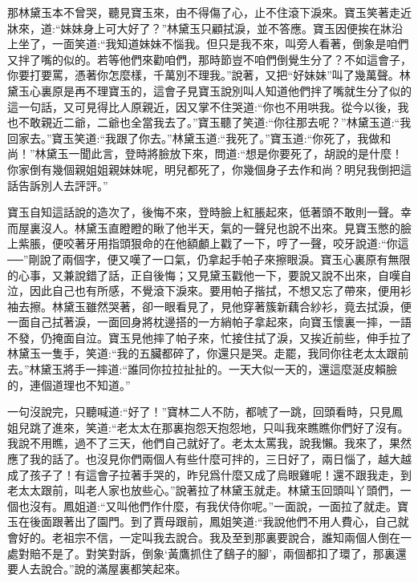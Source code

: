 \begin{parag}
    那林黛玉本不曾哭，聽見寶玉來，由不得傷了心，止不住滾下淚來。寶玉笑著走近牀來，道:“妹妹身上可大好了？”林黛玉只顧拭淚，並不答應。寶玉因便挨在牀沿上坐了，一面笑道:“我知道妹妹不惱我。但只是我不來，叫旁人看著，倒象是咱們又拌了嘴的似的。若等他們來勸咱們，那時節豈不咱們倒覺生分了？不如這會子，你要打要罵，憑著你怎麼樣，千萬別不理我。”說著，又把“好妹妹”叫了幾萬聲。林黛玉心裏原是再不理寶玉的，這會子見寶玉說別叫人知道他們拌了嘴就生分了似的這一句話，又可見得比人原親近，因又掌不住哭道:“你也不用哄我。從今以後，我也不敢親近二爺，二爺也全當我去了。”寶玉聽了笑道:“你往那去呢？”林黛玉道:“我回家去。”寶玉笑道:“我跟了你去。”林黛玉道:“我死了。”寶玉道:“你死了，我做和尚！”林黛玉一聞此言，登時將臉放下來，問道:“想是你要死了，胡說的是什麼！你家倒有幾個親姐姐親妹妹呢，明兒都死了，你幾個身子去作和尚？明兒我倒把這話告訴別人去評評。”
\end{parag}


\begin{parag}
    寶玉自知這話說的造次了，後悔不來，登時臉上紅脹起來，低著頭不敢則一聲。幸而屋裏沒人。林黛玉直瞪瞪的瞅了他半天，氣的一聲兒也說不出來。見寶玉憋的臉上紫脹，便咬著牙用指頭狠命的在他額顱上戳了一下，哼了一聲，咬牙說道:“你這──”剛說了兩個字，便又嘆了一口氣，仍拿起手帕子來擦眼淚。寶玉心裏原有無限的心事，又兼說錯了話，正自後悔；又見黛玉戳他一下，要說又說不出來，自嘆自泣，因此自己也有所感，不覺滾下淚來。要用帕子揩拭，不想又忘了帶來，便用衫袖去擦。林黛玉雖然哭著，卻一眼看見了，見他穿著簇新藕合紗衫，竟去拭淚，便一面自己拭著淚，一面回身將枕邊搭的一方綃帕子拿起來，向寶玉懷裏一摔，一語不發，仍掩面自泣。寶玉見他摔了帕子來，忙接住拭了淚，又挨近前些，伸手拉了林黛玉一隻手，笑道:“我的五臟都碎了，你還只是哭。走罷，我同你往老太太跟前去。”林黛玉將手一摔道:“誰同你拉拉扯扯的。一天大似一天的，還這麼涎皮賴臉的，連個道理也不知道。”
\end{parag}


\begin{parag}
    一句沒說完，只聽喊道:“好了！”寶林二人不防，都唬了一跳，回頭看時，只見鳳姐兒跳了進來，笑道:“老太太在那裏抱怨天抱怨地，只叫我來瞧瞧你們好了沒有。我說不用瞧，過不了三天，他們自己就好了。老太太罵我，說我懶。我來了，果然應了我的話了。也沒見你們兩個人有些什麼可拌的，三日好了，兩日惱了，越大越成了孩子了！有這會子拉著手哭的，昨兒爲什麼又成了烏眼雞呢！還不跟我走，到老太太跟前，叫老人家也放些心。”說著拉了林黛玉就走。林黛玉回頭叫丫頭們，一個也沒有。鳳姐道:“又叫他們作什麼，有我伏侍你呢。”一面說，一面拉了就走。寶玉在後面跟著出了園門。到了賈母跟前，鳳姐笑道:“我說他們不用人費心，自己就會好的。老祖宗不信，一定叫我去說合。我及至到那裏要說合，誰知兩個人倒在一處對賠不是了。對笑對訴，倒象‘黃鷹抓住了鷂子的腳’，兩個都扣了環了，那裏還要人去說合。”說的滿屋裏都笑起來。
\end{parag}


